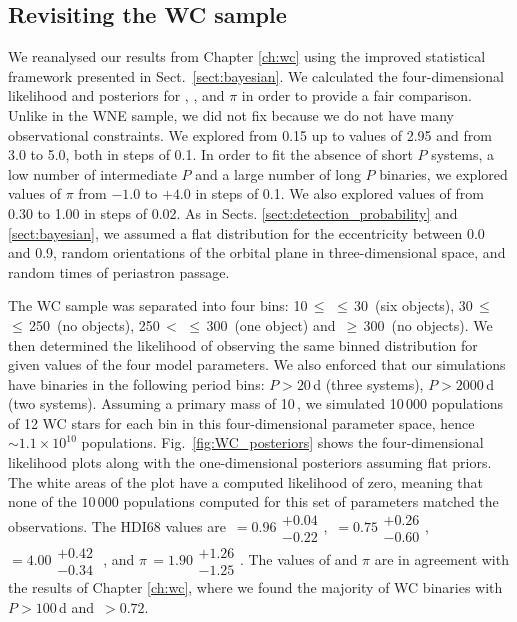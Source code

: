 \subsection{Revisiting the WC sample}
\label{sect:WC_bayesian}
We reanalysed our results from Chapter \ref{ch:wc} using the improved statistical framework presented in Sect.~\ref{sect:bayesian}. We calculated the four-dimensional likelihood and posteriors for \logPmin{}, \logPmax{}, \fintWNE{} and $\pi$ in order to provide a fair comparison. Unlike in the WNE sample, we did not fix \Pmin{} because we do not have many observational constraints. We explored \logPmin{} from 0.15 up to values of 2.95 and \logPmax{} from 3.0 to 5.0, both in steps of 0.1. In order to fit the absence of short $P$ systems, a low number of intermediate $P$ and a large number of long $P$ binaries, we explored values of $\pi$ from $-1.0$ to $+4.0$ in steps of 0.1. We also explored values of \fintWC{} from 0.30 to 1.00 in steps of 0.02. As in Sects. \ref{sect:detection_probability} and \ref{sect:bayesian}, we assumed a flat distribution for the eccentricity between 0.0 and 0.9, random orientations of the orbital plane in three-dimensional space, and random times of periastron passage. 

The WC sample was separated into four \DelRV{} bins: 10\,$\le$\,\DelRV{}\,$\le$\,30\,\kms{} (six objects), 30\,$\le$\,\DelRV{}\,$\le$\,250\,\kms{} (no objects), 250\,$<$\,\DelRV{}\,$\le$\,300\,\kms{} (one object) and  \DelRV{}\,$\ge$\,300\,\kms{} (no objects). We then determined the likelihood of observing the same binned distribution for given values of the four model parameters. We also enforced that our simulations have binaries in the following period bins: $P > 20$\,d (three systems), $P > 2000$\,d (two systems). Assuming a primary mass of 10\,\Msun{}, we simulated 10\,000 populations of 12 WC stars for each bin in this four-dimensional parameter space, hence $\sim 1.1\times10^{10}$ populations. Fig.~\ref{fig:WC_posteriors} shows the four-dimensional likelihood plots along with the one-dimensional posteriors assuming flat priors. The white areas of the plot have a computed likelihood of zero, meaning that none of the 10\,000 populations computed for this set of parameters matched the observations. The HDI68 values are \fintWC{}\,$= 0.96\substack{+0.04 \\ -0.22}$, \logPmin{}\,$= 0.75\substack{+0.26 \\ -0.60}$, \logPmax{}\,$= 4.00\substack{+0.42 \\ -0.34}$ , and $\pi$\,$= 1.90\substack{+1.26 \\ -1.25}$. The values of \fintWC{} and $\pi$ are in agreement with the results of Chapter \ref{ch:wc}, where we found the majority of WC binaries with $P>100$\,d and \fintWC{}\,$> 0.72$.

